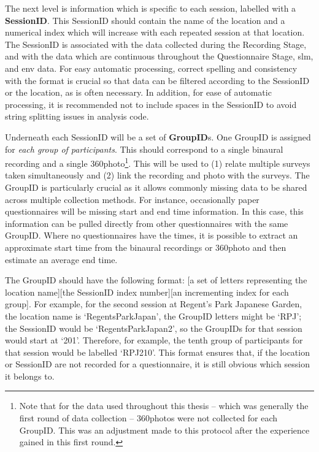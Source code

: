    The next level is information which is specific to each session, labelled with a \textbf{SessionID}. This SessionID should contain the name of the location and a numerical index which will increase with each repeated session at that location. The SessionID is associated with the data collected during the Recording Stage, and with the data which are continuous throughout the Questionnaire Stage, \gls{slm}, and \gls{env} data. For easy automatic processing, correct spelling and consistency with the format is crucial so that data can be filtered according to the SessionID or the location, as is often necessary. In addition, for ease of automatic processing, it is recommended not to include spaces in the SessionID to avoid string splitting issues in analysis code.

   Underneath each SessionID will be a set of \textbf{GroupID}s. One GroupID is assigned for \emph{each group of participants}. This should correspond to a single binaural recording and a single 360\degree photo\footnote{Note that for the data used throughout this thesis -- which was generally the first round of data collection -- 360\degree photos were not collected for each GroupID. This was an adjustment made to this protocol after the experience gained in this first round.}. This will be used to (1) relate multiple surveys taken simultaneously and (2) link the recording and photo with the surveys. The GroupID is particularly crucial as it allows commonly missing data to be shared across multiple collection methods. For instance, occasionally paper questionnaires will be missing start and end time information. In this case, this information can be pulled directly from other questionnaires with the same GroupID. Where no questionnaires have the times, it is possible to extract an approximate start time from the binaural recordings or 360\degree photo and then estimate an average end time.

   The GroupID should have the following format: [a set of letters representing the location name][the SessionID index number][an incrementing index for each group]. For example, for the second session at Regent's Park Japanese Garden, the location name is `RegentsParkJapan', the GroupID letters might be `RPJ'; the SessionID would be `RegentsParkJapan2', so the GroupIDs for that session would start at `201'. Therefore, for example, the tenth group of participants for that session would be labelled `RPJ210'. This format ensures that, if the location or SessionID are not recorded for a questionnaire, it is still obvious which session it belongs to.

